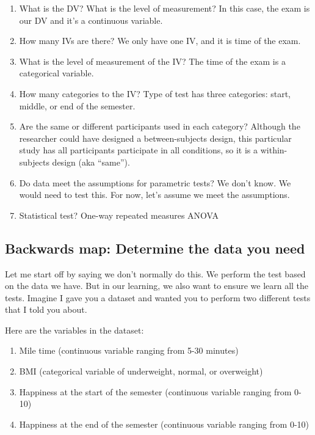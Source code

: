 \documentclass[
]{book}
\providecommand{\tightlist}{%
  \setlength{\itemsep}{0pt}\setlength{\parskip}{0pt}}
\begin{document}
\begin{enumerate}
\def\labelenumi{\arabic{enumi}.}
\item
  What is the DV? What is the level of measurement? In this case, the exam is our DV and it's a continuous variable.
\item
  How many IVs are there? We only have one IV, and it is time of the exam.
\item
  What is the level of measurement of the IV? The time of the exam is a categorical variable.
\item
  How many categories to the IV? Type of test has three categories: start, middle, or end of the semester.
\item
  Are the same or different participants used in each category? Although the researcher could have designed a between-subjects design, this particular study has all participants participate in all conditions, so it is a within-subjects design (aka ``same'').
\item
  Do data meet the assumptions for parametric tests? We don't know. We would need to test this. For now, let's assume we meet the assumptions.
\item
  Statistical test? One-way repeated measures ANOVA
\end{enumerate}

\hypertarget{backwards-map-determine-the-data-you-need}{%
\subsection{Backwards map: Determine the data you need}\label{backwards-map-determine-the-data-you-need}}

Let me start off by saying we don't normally do this. We perform the test based on the data we have. But in our learning, we also want to ensure we learn all the tests. Imagine I gave you a dataset and wanted you to perform two different tests that I told you about.

Here are the variables in the dataset:

\begin{enumerate}
\def\labelenumi{\arabic{enumi}.}
\tightlist
\item
  Mile time (continuous variable ranging from 5-30 minutes)
\item
  BMI (categorical variable of underweight, normal, or overweight)
\item
  Happiness at the start of the semester (continuous variable ranging from 0-10)
\item
  Happiness at the end of the semester (continuous variable ranging from 0-10)
\end{enumerate}
\end{document}
